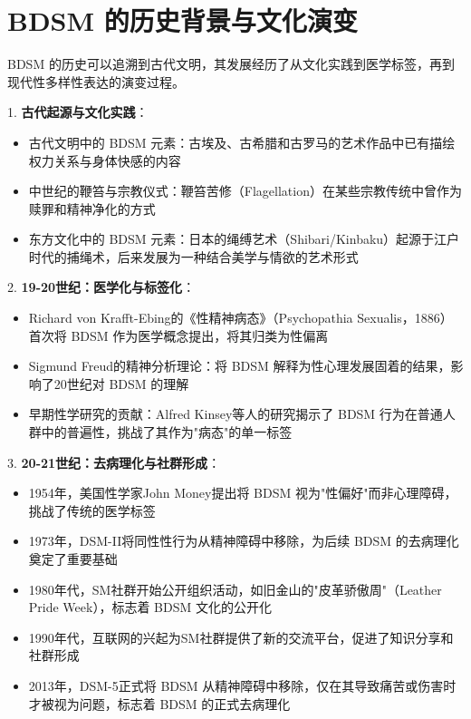 \documentclass[12pt,UTF8]{ctexbook}
\begin{document}
\section{BDSM 的历史背景与文化演变}

BDSM 的历史可以追溯到古代文明，其发展经历了从文化实践到医学标签，再到现代性多样性表达的演变过程。

1. \textbf{古代起源与文化实践}：
  \begin{itemize}
  \item 古代文明中的 BDSM 元素：古埃及、古希腊和古罗马的艺术作品中已有描绘权力关系与身体快感的内容
  \item 中世纪的鞭笞与宗教仪式：鞭笞苦修（Flagellation）在某些宗教传统中曾作为赎罪和精神净化的方式
  \item 东方文化中的 BDSM 元素：日本的绳缚艺术（Shibari/Kinbaku）起源于江户时代的捕绳术，后来发展为一种结合美学与情欲的艺术形式
  \end{itemize}

2. \textbf{19-20世纪：医学化与标签化}：
  \begin{itemize}
  \item Richard von Krafft-Ebing的《性精神病态》（Psychopathia Sexualis，1886）首次将 BDSM 作为医学概念提出，将其归类为性偏离
  \item Sigmund Freud的精神分析理论：将 BDSM 解释为性心理发展固着的结果，影响了20世纪对 BDSM 的理解
  \item 早期性学研究的贡献：Alfred Kinsey等人的研究揭示了 BDSM 行为在普通人群中的普遍性，挑战了其作为"病态"的单一标签
  \end{itemize}

3. \textbf{20-21世纪：去病理化与社群形成}：
  \begin{itemize}
  \item 1954年，美国性学家John Money提出将 BDSM 视为"性偏好"而非心理障碍，挑战了传统的医学标签
  \item 1973年，DSM-II将同性性行为从精神障碍中移除，为后续 BDSM 的去病理化奠定了重要基础
  \item 1980年代，SM社群开始公开组织活动，如旧金山的"皮革骄傲周"（Leather Pride Week），标志着 BDSM 文化的公开化
  \item 1990年代，互联网的兴起为SM社群提供了新的交流平台，促进了知识分享和社群形成
  \item 2013年，DSM-5正式将 BDSM 从精神障碍中移除，仅在其导致痛苦或伤害时才被视为问题，标志着 BDSM 的正式去病理化
  \end{itemize}
\end{document}
